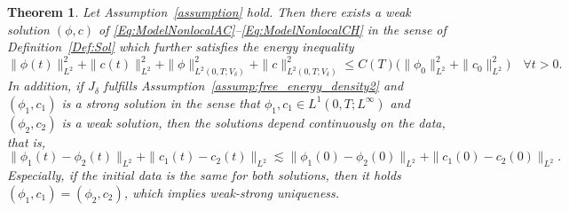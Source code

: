 \documentclass[]{article}
\newtheorem{theorem}{Theorem}[section]
\begin{document}
\begin{theorem}
	\label{thm:NLAC}
	Let Assumption~\ref{assumption} hold. Then
	there exists a weak solution
	$(\phi,c)$ of \eqref{Eq:ModelNonlocalAC}--\eqref{Eq:ModelNonlocalCH} in the sense of Definition~\ref{Def:Sol} which further satisfies
	the energy inequality
	\begin{equation} \label{EnergyIneq} \|\phi(t)\|_{L^2}^2+\|c(t)\|_{L^2}^2 + \|\phi\|_{L^2(0,T; V_\delta)}^2+\|c\|_{L^2(0,T;V_\delta)}^2 \leq C(T) \big( \|\phi_0\|_{L^2}^2+\|c_0\|_{L^2}^2 \big) \quad \forall t>0.
	\end{equation}
	In addition, if $J_\delta$ fulfills Assumption~\ref{assump:free_energy_density2} and $(\phi_1,c_1)$ is a strong solution in the sense that $\phi_1,c_1\in L^1(0,T;L^\infty)$ and $(\phi_2,c_2)$ is a weak solution, then the solutions depend continuously on the data, that is, 
	\[
	\|\phi_1(t)-\phi_2(t)\|_{L^{2}}+\|c_1(t)-c_2(t)\|_{L^{2}}
	\lesssim  \|\phi_{1}(0)-\phi_{2}(0)\|_{L^{2}}+\|c_{1}(0)-c_{2}(0)\|_{L^{2}}.
	\]
	Especially, if the initial data is the same for both solutions, then it holds $(\phi_1,c_1)=(\phi_2,c_2)$, which implies weak-strong uniqueness.
\end{theorem}
\end{document}
